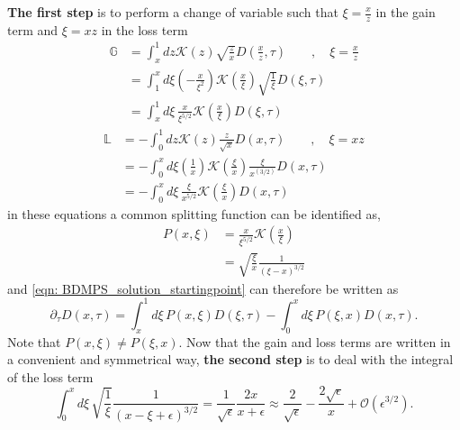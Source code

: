\documentclass[main.tex]{subfiles}
\begin{document}
\textbf{The first step} is to perform a change of variable such that \(\xi = \frac{x}{z}\) in the gain term and \(\xi = xz\) in the loss term
\begin{align}\label{eqn: BDMPS_solution_gainterm_changeofvariable}
    \mathbb{G} &= \int_x^1 dz \mathcal{K}(z) \sqrt{\frac{z}{x}} D\left(\frac{x}{z}, \tau\right) \qquad,\quad \xi = \frac{x}{z} \nonumber \\
    &= \int_1^x d\xi \left(-\frac{x}{\xi^2}\right) \mathcal{K}\left(\frac{x}{\xi}\right) \sqrt{\frac{1}{\xi}} D(\xi, \tau) \nonumber \\
    &= \int_x^1 d\xi \,\frac{x}{\xi^{5/2}} \mathcal{K}\left(\frac{x}{\xi}\right) D(\xi, \tau)
\end{align}
\begin{align}\label{eqn: BDMPS_solution_lossterm_changeofvariable}
    \mathbb{L} &= - \int_0^1 dz \mathcal{K}(z) \frac{z}{\sqrt{x}} D(x,\tau)\qquad , \quad \xi = xz \nonumber \\
    &= - \int_0^x d\xi \left(\frac{1}{x}\right) \mathcal{K}\left(\frac{\xi}{x}\right) \frac{\xi}{x^(3/2)} D(x,\tau) \nonumber \\
    &= - \int_0^x d\xi \,\frac{\xi}{x^{5/2}} \mathcal{K}\left(\frac{\xi}{x}\right) D(x,\tau)
\end{align}
in these equations a common splitting function can be identified as, 
\begin{align}\label{eqn: BDMPS_solution_splittingfunction_xivariable}
    P(x,\xi) &= \frac{x}{\xi^{5/2}} \mathcal{K}\left(\frac{x}{\xi}\right) \nonumber \\
    &= \sqrt{\frac{\xi}{x}} \frac{1}{(\xi-x)^{3/2}}
\end{align}
and \autoref{eqn: BDMPS_solution_startingpoint} can therefore be written as 
\begin{equation}\label{eqn: BDMPS_solution_evoleqn_with_xisplitfunc}
    \partial_\tau D(x,\tau) = \int_x^1 d\xi \,P(x,\xi) D(\xi, \tau) - \int_0^x d\xi \,P(\xi,x) D(x,\tau).
\end{equation}
Note that \(P(x,\xi) \neq P(\xi, x)\). 
Now that the gain and loss terms are written in a convenient and symmetrical way, \textbf{the second step} is to deal with the integral of the loss term
\begin{equation}
    \int_0^x d\xi \, \sqrt{\frac{1}{\xi}} \frac{1}{(x-\xi+\epsilon)^{3/2}} = \frac{1}{\sqrt{\epsilon}} \frac{2x}{x+\epsilon} \approx \frac{2}{\sqrt \epsilon} - \frac{2\sqrt{\epsilon}}{x} + \mathcal{O}(\epsilon^{3/2}).
\end{equation}
\end{document}
